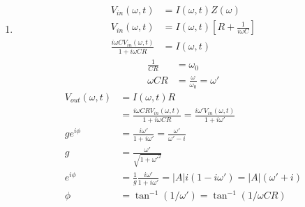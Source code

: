 \documentclass{article}
\begin{document}
\noindent

\begin{enumerate}
\item 
\begin{align*}
V_{in}(\omega, t) &= I(\omega, t)Z(\omega) \\
V_{in}(\omega, t) &= I(\omega, t)\left[ R + \frac{1}{i\omega C}\right] \\
\frac{i \omega C V_{in}(\omega, t)}{1 + i\omega C R} &= I(\omega, t) 
\end{align*}
\begin{align*}
\frac{1}{CR} &= \omega_0\\
\omega C R &= \frac{\omega}{\omega_0} = \omega'
\end{align*}
\begin{align*}
V_{out}(\omega, t) &= I(\omega, t) R \\
                  &= \frac{i\omega C R V_{in}(\omega, t)}{1 + i\omega C R} =
\frac{i\omega' V_{in}(\omega, t)}{1 + i\omega'}\\
       g e^{i \phi} &= \frac{i \omega'}{1 + i \omega'}  = \frac{\omega'}{\omega' - i}\\
       g &= \frac{\omega'}{\sqrt{1 + \omega'^2}}\\
e^{i\phi} &= \frac{1}{g}\frac{i\omega'}{1 + i\omega'} = |A| i(1 - i\omega')
= |A| (\omega' + i) \\
\phi &= \tan^{-1}(1/\omega') = \tan^{-1}(1/\omega C R)
\end{align*}

\end{enumerate}
\end{document}
